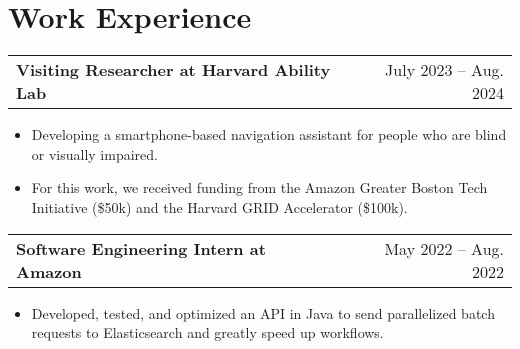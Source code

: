 \documentclass[a4paper,12pt]{article}
\makeatletter
\newenvironment{joblong}[2]
    {
    \begin{tabularx}{\linewidth}{@{}l X r@{}}
    \textbf{#1} & \hfill &  #2 \\[3.75pt]
    \end{tabularx}
    \begin{minipage}[t]{\linewidth}
    \begin{itemize}[nosep,after=\strut, leftmargin=1em, itemsep=3pt,label=--]
    }
    {
    \end{itemize}
    \end{minipage}    
    }
\makeatother
\begin{document}




\vspace{-10pt}
\section{Work Experience}

\begin{joblong}{Visiting Researcher at Harvard Ability Lab}{July 2023 – Aug. 2024}
\item Developing a smartphone-based navigation assistant for people who are blind or visually impaired.
\item For this work, we received funding from the Amazon Greater Boston Tech Initiative (\$50k) and the Harvard GRID Accelerator (\$100k).
\end{joblong}

\begin{joblong}{Software Engineering Intern at Amazon}{May 2022 – Aug. 2022}
\item Developed, tested, and optimized an API in Java to send parallelized batch requests to Elasticsearch and greatly speed up workflows.
\end{joblong}
\end{document}
